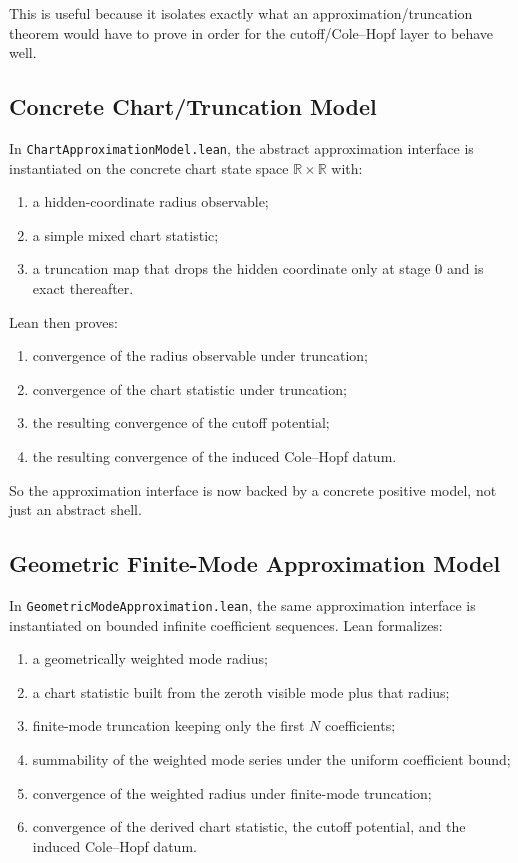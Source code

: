 \documentclass[11pt]{article}
\begin{document}
This is useful because it isolates exactly what an approximation/truncation
theorem would have to prove in order for the cutoff/Cole--Hopf layer to behave
well.

\subsection{Concrete Chart/Truncation Model}

In \texttt{ChartApproximationModel.lean}, the abstract approximation interface
is instantiated on the concrete chart state space \(\mathbb{R}\times\mathbb{R}\)
with:
\begin{enumerate}[leftmargin=1.5em]
  \item a hidden-coordinate radius observable;
  \item a simple mixed chart statistic;
  \item a truncation map that drops the hidden coordinate only at stage \(0\)
  and is exact thereafter.
\end{enumerate}

Lean then proves:
\begin{enumerate}[leftmargin=1.5em]
  \item convergence of the radius observable under truncation;
  \item convergence of the chart statistic under truncation;
  \item the resulting convergence of the cutoff potential;
  \item the resulting convergence of the induced Cole--Hopf datum.
\end{enumerate}

So the approximation interface is now backed by a concrete positive model, not
just an abstract shell.

\subsection{Geometric Finite-Mode Approximation Model}

In \texttt{GeometricModeApproximation.lean}, the same approximation interface is
instantiated on bounded infinite coefficient sequences.  Lean formalizes:
\begin{enumerate}[leftmargin=1.5em]
  \item a geometrically weighted mode radius;
  \item a chart statistic built from the zeroth visible mode plus that radius;
  \item finite-mode truncation keeping only the first \(N\) coefficients;
  \item summability of the weighted mode series under the uniform coefficient
  bound;
  \item convergence of the weighted radius under finite-mode truncation;
  \item convergence of the derived chart statistic, the cutoff potential, and
  the induced Cole--Hopf datum.
\end{enumerate}
\end{document}
